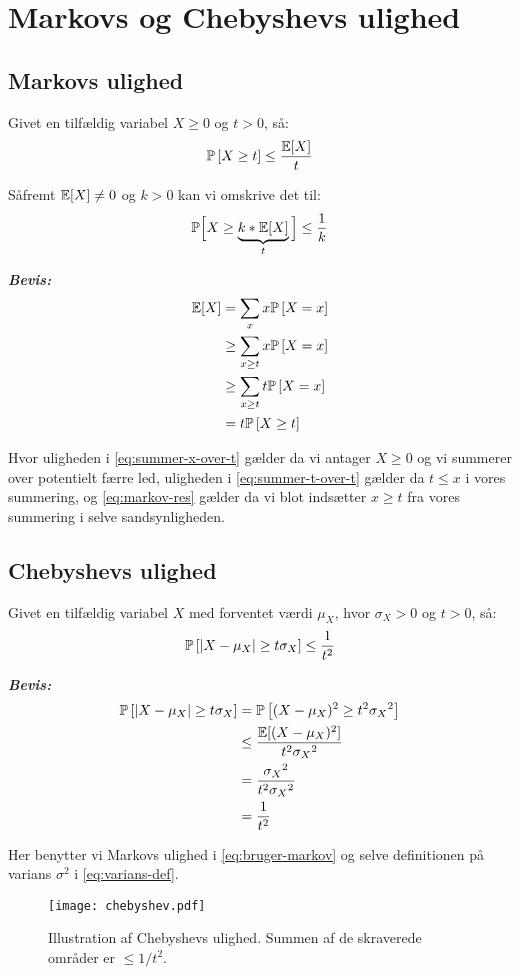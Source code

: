 \section{Markovs og Chebyshevs ulighed}
\subsection{Markovs ulighed}
Givet en tilfældig variabel $X \geq 0$ og $t > 0$, så:
\begin{align}
  \P{X \geq t} \leq \frac{\E[X]}{t} \label{eq:markov}
\end{align}

Såfremt $\E[X] \neq 0$ og $k > 0$ kan vi omskrive det til:
$$
\mathbb{P} \Big[X \geq \underbrace{k * \E[X]}_{t} \Big] \leq \frac{1}{k}
$$

\textit{\textbf{Bevis:}}
\begin{align}
  \E[X]
  &= \sum_x x \P{X = x} \nonumber \\
  &\geq \sum_{x \geq t} x \P{X = x} \label{eq:summer-x-over-t} \\
  &\geq \sum_{x \geq t} t \P{X = x} \label{eq:summer-t-over-t} \\
  &= t \P{X \geq t} \label{eq:markov-res}
\end{align}

Hvor uligheden i \cref{eq:summer-x-over-t} gælder da vi antager $X \geq 0$ og vi summerer over potentielt færre led, uligheden i \cref{eq:summer-t-over-t} gælder da $t \leq x$ i vores summering, og \cref{eq:markov-res} gælder da vi blot indsætter $x \geq t$ fra vores summering i selve sandsynligheden.

\subsection{Chebyshevs ulighed}
Givet en tilfældig variabel $X$ med forventet værdi $\mu_X$, hvor $\sigma_X > 0$ og $t > 0$, så:
\begin{align}
  \P{|X - \mu_X| \geq t \sigma_X} \leq \frac{1}{t^2} \label{eq:chebyshev}
\end{align}

\textit{\textbf{Bevis:}}
\begin{align}
  \P{|X - \mu_X| \geq t \sigma_X}
  &= \P{(X - \mu_X)^2 \geq t^2 {\sigma_X}^2} \nonumber \\
  &\leq \frac{\E[(X - \mu_X)^2]}{t^2 {\sigma_X}^2} \label{eq:bruger-markov} \\
  &= \frac{{\sigma_X}^2}{t^2 {\sigma_X}^2} \label{eq:varians-def} \\
  &= \frac{1}{t^2} \nonumber
\end{align}

Her benytter vi Markovs ulighed i \cref{eq:bruger-markov} og selve definitionen på varians $\sigma^2$ i \cref{eq:varians-def}.

\begin{figure}[H]
  \begin{center}
  \texttt{[image: chebyshev.pdf]}
  \end{center}
  \caption{Illustration af Chebyshevs ulighed. Summen af de skraverede områder er $\leq 1/t^2$.}
  \label{fig:chebyshev}
\end{figure}
